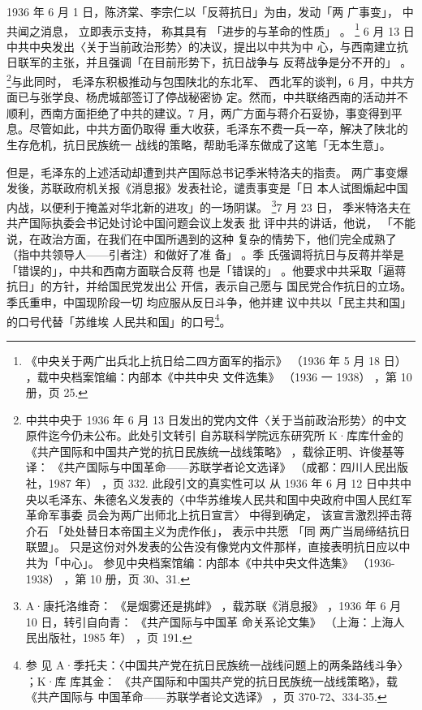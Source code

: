 1936 年 6 月 1 日，陈济棠、李宗仁以「反蒋抗日」为由，发动「两
广事变」， 中共闻之消息，
立即表示支持，
称其具有 「进步的与革命的性质」 。
\footnote{《中央关于两广出兵北上抗日给二四方面军的指示》
（1936 年 5 月 18 日）
，载中央档案馆编：内部本《中共中央
文件选集》
（1936 一 1938）
，第 10 册，页 25.}
6 月 13 日中共中央发出〈关于当前政治形势〉的决议，提出以中共为中
心，与西南建立抗日联军的主张，并且强调「在目前形势下，抗日战争与
反蒋战争是分不开的」 。\footnote{中共中央于 1936 年 6 月 13 日发出的党内文件〈关于当前政治形势〉的中文原件迄今仍未公布。此处引文转引
自苏联科学院远东研究所 K·库库什金的《共产国际和中国共产党的抗日民族统一战线策略》
，载徐正明、许俊基等译：
《共产国际与中国革命——苏联学者论文选译》
（成都：四川人民出版社，1987 年）
，页 332. 此段引文的真实性可以
从 1936 年 6 月 12 日中共中央以毛泽东、朱德名义发表的〈中华苏维埃人民共和国中央政府中国人民红军革命军事委
员会为两广出师北上抗日宣言〉
中得到确定，
该宣言激烈抨击蒋介石
「处处替日本帝国主义为虎作伥」， 表示中共愿
「同 两广当局缔结抗日联盟」。
只是这份对外发表的公告没有像党内文件那样，直接表明抗日应以中共为「中心」。
参见中央档案馆编：内部本《中共中央文件选集》
（1936-1938） ，第 10 册，页 30、31.  }与此同时， 
毛泽东积极推动与包围陕北的东北军、
西北军的谈判，6 月，中共方面已与张学良、杨虎城部签订了停战秘密协
定。然而，中共联络西南的活动并不顺利，西南方面拒绝了中共的建议。7
月，两广方面与蒋介石妥协，事变得到平息。尽管如此，中共方面仍取得
重大收获，毛泽东不费一兵一卒，解决了陕北的生存危机，抗日民族统一
战线的策略，帮助毛泽东做成了这笔「无本生意」。

但是，毛泽东的上述活动却遭到共产国际总书记季米特洛夫的指责。 两广事变爆
发後，苏联政府机关报《消息报》发表社论，谴责事变是「日 本人试图煽起中国
内战，以便利于掩盖对华北新的进攻」的一场阴谋。 \footnote{ A·康托洛维奇：
《是烟雾还是挑衅》 ，载苏联《消息报》 ，1936 年 6 月 10 日，转引自向青：
《共产国际与中国革 命关系论文集》 （上海：上海人民出版社，1985 年） ，页
191.}7 月 23 日， 季米特洛夫在共产国际执委会书记处讨论中国问题会议上发表
批 评中共的讲话，他说， 「不能说，在政治方面，在我们在中国所遇到的这种
复杂的情势下，他们完全成熟了（指中共领导人——引者注）和做好了准 备」 。季
氏强调将抗日与反蒋并举是「错误的」，中共和西南方面联合反蒋 也是「错误的」
。他要求中共采取「逼蒋抗日」的方针，并给国民党发出公 开信，表示自己愿与
国民党合作抗日的立场。季氏重申，中国现阶段一切 均应服从反日斗争，他并建
议中共以「民主共和国」的口号代替「苏维埃 人民共和国」的口号\footnote{参
见 A·季托夫：〈中国共产党在抗日民族统一战线问题上的两条路线斗争〉 ；K·库
库其金： 《共产国际和中国共产党的抗日民族统一战线策略》，载《共产国际与
中国革命——苏联学者论文选译》 ，页 370-72、334-35. }。

